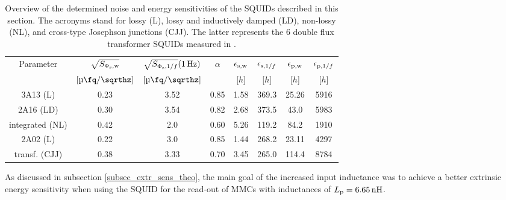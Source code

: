 \begin{table}[t!]
	\centering
	\begin{tabular}{c|*{7}{c}}
		\toprule
		Parameter & $\sqrt{S_{\rm \Phi_{\rm s},w}}$ & $\sqrt{S_{\Phi_{\rm s},1/f}}(\qty{1}{\Hz})$ & $\alpha$ & $\epsilon_{\rm s,w}$ & $\epsilon_{{\rm s},1/f}$ & $\epsilon_{\rm p,w}$ & $\epsilon_{{\rm p},1/f}$ \\
		& $[\unit[per-mode=symbol]{\micro\fq\per\sqrthz}]$ & $[\unit[per-mode=symbol]{\micro\fq\per\sqrthz}]$ &  & [$h$] & [$h$] & [$h$] & [$h$] \\
		\midrule
		3A13 (L) & 0.23 & 3.52 & 0.85 & 1.58 & 369.3 & 25.26 & 5916 \\
		2A16 (LD) & 0.30 & 3.54 & 0.82 & 2.68 & 373.5 & 43.0 & 5983 \\
		integrated (NL) & 0.42 & 2.0 & 0.60 & 5.26 & 119.2 & 84.2 & 1910 \\
		2A02 (L) & 0.22 & 3.0 & 0.85 & 1.44 & 268.2 & 23.11 & 4297 \\
		transf. (CJJ) & 0.38 & 3.33 & 0.70 & 3.45 & 265.0 & 114.4 & 8784 \\
	\end{tabular}
	\caption{Overview of the determined noise and energy sensitivities of the SQUIDs described in this section. The acronyms stand for lossy (L), lossy and inductively damped (LD), non-lossy (NL), and cross-type Josephson junctions (CJJ). The latter represents the \qty{6}{\nH} double flux transformer SQUIDs measured in \cite{Bauer2022}.}
	\label{tab:noise}
\end{table}
As discussed in subsection \ref{subsec_extr_sens_theo}, the main goal of the increased input inductance was to achieve a better extrinsic energy sensitivity when using the SQUID for the read-out of MMCs with inductances of $L_{\rm p}=\qty{6.65}{\nH}$.
